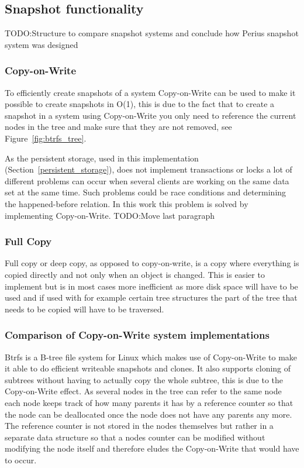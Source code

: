\documentclass[a4paper,12pt]{article}
\newcounter{subsubsubsection}[subsubsection]
\newcommand{\fix}{\colorbox{yellow!30}{TODO:}}
\begin{document}
\subsection{Snapshot functionality}
\fix Structure to compare snapshot systems and conclude how Perius snapshot system was designed
\subsubsection{Copy-on-Write}
\label{sec:copy-on-write}
To efficiently create snapshots of a system Copy-on-Write can be used to make it possible to create
snapshots in O(1)\cite{BTRFS}, this is due to the fact that to create a snapshot in a system using
Copy-on-Write you only need to reference the current nodes in the tree and make sure that they are
not removed, see Figure~\ref{fig:btrfs_tree}.

As the persistent storage, used in this implementation (Section~\ref{persistent_storage}), does not
implement transactions or locks a lot of different problems can occur when several clients are
working on the same data set at the same time. Such problems could be race conditions and
determining the happened-before relation. In this work this problem is solved by implementing
Copy-on-Write.
\fix Move last paragraph

\subsubsection{Full Copy}
Full copy or deep copy, as opposed to copy-on-write, is a copy where everything is copied directly
and not only when an object is changed. This is easier to implement but is in most cases more
inefficient as more disk space will have to be used and if used with for example certain tree 
structures the part of the tree that needs to be copied will have to be traversed. 

\subsubsection{Comparison of Copy-on-Write system implementations}
Btrfs is a B-tree file system for Linux which makes use of Copy-on-Write to make it able to do
efficient writeable snapshots and clones. It also supports cloning of subtrees without having to
actually copy the whole subtree, this is due to the Copy-on-Write effect. As several nodes in the
tree can refer to the same node each node keeps track of how many parents it has by a reference
counter so that the node can be deallocated once the node does not have any parents any more. The
reference counter is not stored in the nodes themselves but rather in a separate data structure so
that a nodes counter can be modified without modifying the node itself and therefore eludes the
Copy-on-Write that would have to occur.
\end{document}
